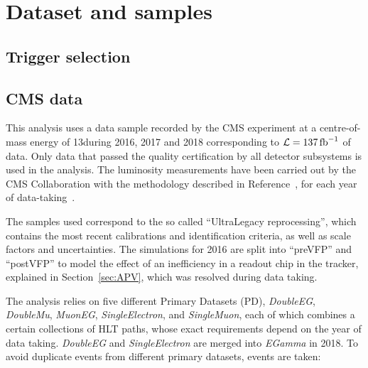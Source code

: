 \section{Dataset and samples}
\label{sec:datasets}

\subsection{Trigger selection}


\subsection{CMS data}
This analysis uses a data sample recorded by the CMS experiment at a centre-of-mass energy of 13\TeV during 2016, 2017 and 2018 corresponding to $\mathcal{L} = 137 \mbox{\ensuremath{\,\text{fb}^{-1}}}$ of data.
Only data that passed the quality certification by all detector subsystems is used in the analysis.
The luminosity measurements have been carried out by the CMS Collaboration
with the methodology described in Reference~\cite{CMS-LUM-17-003},
for each year of data-taking~\cite{CMS-LUM-17-004, CMS-LUM-18-002}.

The samples used correspond to the so called ``UltraLegacy reprocessing'',
which contains the most recent calibrations and identification criteria,
as well as scale factors and uncertainties.
The simulations for 2016 are split into ``preVFP'' and ``postVFP'' to model the effect
of an inefficiency in a readout chip in the tracker, explained in Section~\ref{sec:APV}, which was resolved during data taking.

The analysis relies on five different Primary Datasets (PD),
{\it DoubleEG}, {\it DoubleMu}, {\it MuonEG}, {\it SingleElectron}, and {\it SingleMuon},
each of which combines a certain collections of HLT paths, whose exact requirements depend on the year of data
taking. {\it DoubleEG} and {\it SingleElectron} are merged into {\it EGamma} in 2018.
To avoid duplicate events from different primary datasets, events are taken:

